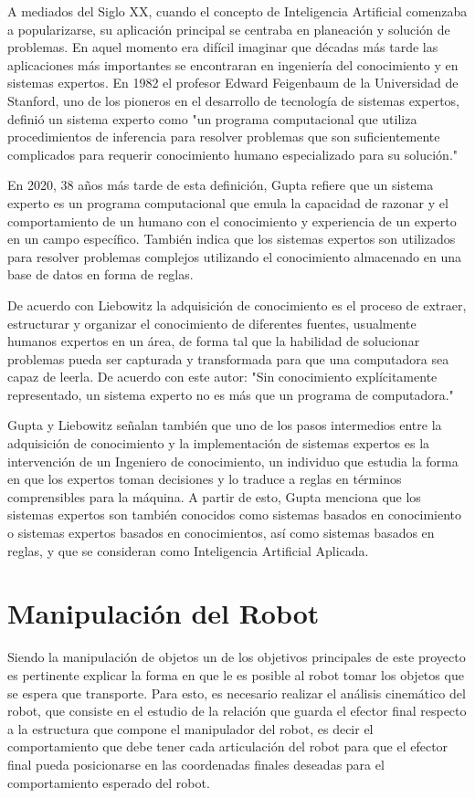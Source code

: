 A mediados del Siglo XX, cuando el concepto de Inteligencia Artificial comenzaba a popularizarse, su aplicación principal se centraba en planeación y solución de problemas. En aquel momento era difícil imaginar que décadas más tarde las aplicaciones más importantes se encontraran en ingeniería del conocimiento y en sistemas expertos. En 1982 el profesor Edward Feigenbaum de la Universidad de Stanford, uno de los pioneros en el desarrollo de tecnología de sistemas expertos, definió un sistema experto como "un programa computacional que utiliza procedimientos de inferencia para resolver problemas que son suficientemente complicados para requerir conocimiento humano especializado para su solución."
\cite{giarratano_zhuan_2002}

En 2020, 38 años más tarde de esta definición, Gupta \cite{gupta_artificial_2020} refiere que un sistema experto es un programa computacional que emula la capacidad de razonar y el comportamiento de un humano con el conocimiento y experiencia de un experto en un campo específico. También indica que los sistemas expertos son utilizados para resolver problemas complejos utilizando el conocimiento almacenado en una base de datos en forma de reglas. 

De acuerdo con Liebowitz \cite{liebowitz_handbook_2019} la adquisición de conocimiento es el proceso de extraer, estructurar y organizar el conocimiento de diferentes fuentes, usualmente humanos expertos en un área, de forma tal que la habilidad de solucionar problemas pueda ser capturada y transformada para que una computadora sea capaz de leerla. De acuerdo con este autor: "Sin conocimiento explícitamente representado, un sistema experto no es más que un programa de computadora."

Gupta y Liebowitz señalan también que uno de los pasos intermedios entre la adquisición de conocimiento y la implementación de sistemas expertos es la intervención de un Ingeniero de conocimiento, un individuo que estudia la forma en que los expertos toman decisiones y lo traduce a reglas en términos comprensibles para la máquina. A partir de esto, Gupta menciona que los sistemas expertos son también conocidos como sistemas basados en conocimiento o sistemas expertos basados en conocimientos, así como sistemas basados en reglas, y que se consideran como Inteligencia Artificial Aplicada. 

\section{Manipulación del Robot}
Siendo la manipulación de objetos un de los objetivos principales de este proyecto es pertinente explicar la forma en que le es posible al robot tomar los objetos que se espera que transporte. Para esto, es necesario realizar el análisis cinemático del robot, que consiste en el estudio de la relación que guarda el efector final respecto a la estructura que compone el manipulador del robot, es decir el comportamiento que debe tener cada articulación del robot para que el efector final pueda posicionarse en las coordenadas finales deseadas para el comportamiento esperado del robot.

